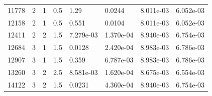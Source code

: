 \documentclass[preview]{standalone}
\begin{document}
{{\begin{tabular}{L{1.2cm}C{1.2cm} C{0.3cm}C{0.5cm} C{1.4cm}C{1.4cm} C{1.4cm}C{1.4cm}}
  11778  &     2  & 1     & 0.5 &  1.29  & 0.0244  & 8.011e-03 &  6.052e-03   \\ 
  12158  &     2  & 1     & 0.5 &  0.551  & 0.0104  & 8.011e-03 &  6.052e-03   \\ 
  12411  &     2  & 2     & 1.5 &  7.279e-03  & 1.370e-04  & 8.940e-03 &  6.754e-03   \\ 
  12684  &     3  & 1     & 1.5 &  0.0128  & 2.420e-04  & 8.983e-03 &  6.786e-03   \\ 
  12907  &     3  & 1     & 1.5 &  0.359  & 6.787e-03  & 8.983e-03 &  6.786e-03   \\ 
  13260  &     3  & 2     & 2.5 &  8.581e-03  & 1.620e-04  & 8.675e-03 &  6.554e-03   \\ 
  14122  &     3  & 2     & 1.5 &  0.0231  & 4.360e-04  & 8.940e-03 &  6.754e-03   \\ 
\hline 
\end{tabular} 

}}
\end{document}
